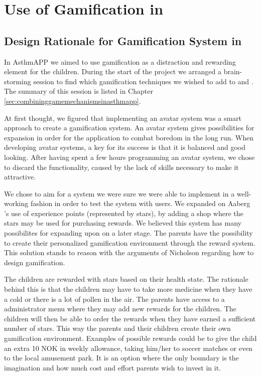 \section{Use of Gamification in \app{}}
\label{sec:useofgamificationinapp}

\subsection{Design Rationale for Gamification System in \app{}}
\label{sec:designrationalegamification}
In AsthmAPP we aimed to use gamification as a distraction and rewarding element for the children. During the start of the project we arranged a brain-storming session to find which gamification techniques we wished to add to \app{} and \ab{}. The summary of this session is listed in Chapter \ref{sec:combininggamemechanismsinasthmapp}. 

At first thought, we figured that implementing an avatar system was a smart approach to create a gamification system. An avatar system gives possibilities for expansion in order for the application to combat boredom in the long run. When developing avatar systems, a key for its success is that it is balanced and good looking. After having spent a few hours programming an avatar system, we chose to discard the functionality, caused by the lack of skills necessary to make it attractive. 

We chose to aim for a system we were sure we were able to implement in a well-working fashion in order to test the system with users. We expanded on Aaberg \etal{}'s use of experience points (represented by stars), by adding a shop where the stars may be used for purchasing rewards. We believed this system has many possibilites for expanding upon on a later stage. The parents have the possibility to create their personalized gamification environment through the reward system. This solution stands to reason with the arguments of Nicholson regarding how to design gamification\cite{nicholson2012user}.

The children are rewarded with stars based on their health state. The rationale behind this is that the children may have to take more medicine when they have a cold or there is a lot of pollen in the air. The parents have access to a administrator menu where they may add new rewards for the children. The children will then be able to order the rewards when they have earned a sufficient number of stars. This way the parents and their children create their own gamification environment. Examples of possible rewards could be to give the child an extra 10 NOK in weekly allowance, taking him/her to soccer matches or even to the local amusement park. It is an option where the only boundary is the imagination and how much cost and effort parents wish to invest in it.    

